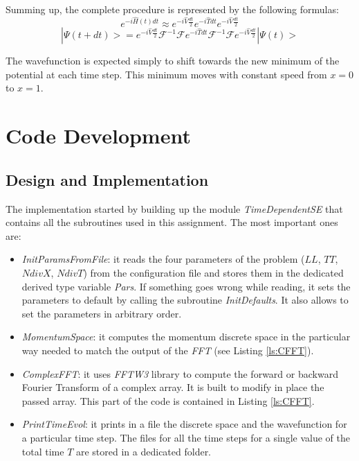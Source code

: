 \documentclass[11pt,a4paper]{article}
\begin{document}
Summing up, the complete procedure is represented by the following formulas:
\begin{equation}
e^{-i\hat H(t) dt} \approx e^{-i\hat V\frac{dt}{2}} e^{-i\hat Tdt} e^{-i\hat V\frac{dt}{2}}
\label{eq:Strang}
\end{equation}
\begin{equation}
|\Psi(t+dt)> = e^{-i\hat V\frac{dt}{2}} \mathcal{F}^{-1}\mathcal{F} e^{-i\hat Tdt} \mathcal{F}^{-1}\mathcal{F} e^{-i\hat V\frac{dt}{2}} |\Psi(t)>
\label{eq:Fourier}
\end{equation}

The wavefunction is expected simply to shift towards the new minimum of the potential at each time step. This minimum moves with constant speed from $x=0$ to $x=1$.

\section{Code Development} %

\subsection{Design and Implementation}
The implementation started by building up the module \textit{TimeDependentSE} that contains all the subroutines used in this assignment. The most important ones are:
\begin{itemize}
	\item \textit{InitParamsFromFile}: it reads the four parameters of the problem ($LL$, $TT$, $NdivX$, $NdivT$) from the configuration file and stores them in the dedicated derived type variable \textit{Pars}. If something goes wrong while reading, it sets the parameters to default by calling the subroutine \textit{InitDefaults}. It also allows to set the parameters in arbitrary order.
	\item \textit{MomentumSpace}: it computes the momentum discrete space in the particular way needed to match the output of the \textit{FFT} (see Listing \ref{ls:CFFT}).
	\item \textit{ComplexFFT}: it uses \textit{FFTW3} library to compute the forward or backward Fourier Transform of a complex array. It is built to modify in place the passed array. This part of the code is contained in Listing \ref{ls:CFFT}.
	\item \textit{PrintTimeEvol}: it prints in a file the discrete space and the wavefunction for a particular time step. The files for all the time steps for a single value of the total time $T$ are stored in a dedicated folder.
\end{itemize}
\end{document}
